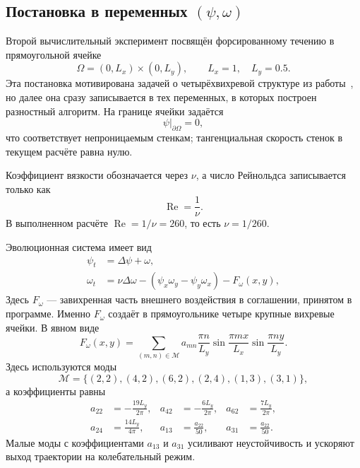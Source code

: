 \documentclass[12pt,a4paper]{article}
\newcommand{\Reynolds}{\operatorname{Re}}
\newcommand{\Laplace}{\Delta}
\begin{document}
\subsection{Постановка в переменных \texorpdfstring{\((\psi,\omega)\)}{psi, omega}}

Второй вычислительный эксперимент посвящён форсированному течению в прямоугольной ячейке
\begin{equation}
    \Omega=(0,L_x)\times(0,L_y),
    \qquad
    L_x=1,\quad L_y=0.5.
    \label{eq:kornev-domain}
\end{equation}
Эта постановка мотивирована задачей о четырёхвихревой структуре из работы~\cite{kornev2018}, но далее она сразу записывается в тех переменных, в которых построен разностный алгоритм.
На границе ячейки задаётся
\begin{equation}
    \psi\big|_{\partial\Omega}=0,
    \label{eq:kornev-psi-wall}
\end{equation}
что соответствует непроницаемым стенкам; тангенциальная скорость стенок в текущем расчёте равна нулю.

Коэффициент вязкости обозначается через \(\nu\), а число Рейнольдса записывается только как
\begin{equation}
    \Reynolds=\frac{1}{\nu}.
    \label{eq:kornev-re-nu}
\end{equation}
В выполненном расчёте \(\Reynolds=1/\nu=260\), то есть \(\nu=1/260\).

Эволюционная система имеет вид
\begin{equation}
\begin{aligned}
    \psi_t
    &=
    \Laplace\psi+\omega,\\
    \omega_t
    &=
    \nu\Laplace\omega
    -
    \left(\psi_x\omega_y-\psi_y\omega_x\right)
    -
    F_\omega(x,y),
\end{aligned}
\label{eq:kornev-pseudo-system}
\end{equation}
Здесь \(F_\omega\) --- завихренная часть внешнего воздействия в соглашении, принятом в программе.
Именно \(F_\omega\) создаёт в прямоугольнике четыре крупные вихревые ячейки.
В явном виде
\begin{equation}
    F_\omega(x,y)
    =
    \sum_{(m,n)\in\mathcal M}
    a_{mn}\frac{\pi n}{L_y}
    \sin\frac{\pi m x}{L_x}
    \sin\frac{\pi n y}{L_y}.
    \label{eq:omega-forcing}
\end{equation}
Здесь используются моды
\[
    \mathcal M=\{(2,2),(4,2),(6,2),(2,4),(1,3),(3,1)\},
\]
а коэффициенты равны
\begin{equation}
\begin{aligned}
    a_{22}&=-\frac{19L_y}{2\pi},&
    a_{42}&=-\frac{6L_y}{2\pi},&
    a_{62}&=\frac{7L_y}{2\pi},\\
    a_{24}&=\frac{14L_y}{4\pi},&
    a_{13}&=\frac{a_{22}}{50},&
    a_{31}&=\frac{a_{22}}{50}.
\end{aligned}
\label{eq:force-coefficients}
\end{equation}
Малые моды с коэффициентами \(a_{13}\) и \(a_{31}\) усиливают неустойчивость и ускоряют выход траектории на колебательный режим.
\end{document}
